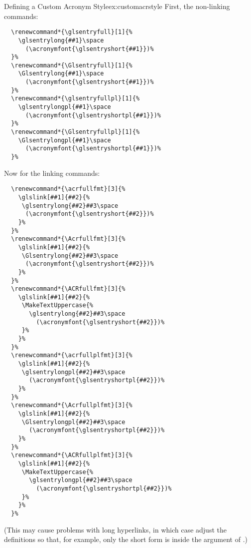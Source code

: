 \documentclass[report,inlinetitle]{nlctdoc}
\begin{document}
\begin{example}{Defining a Custom Acronym Style}{ex:customacrstyle}
First, the non-linking commands: 
\begin{verbatim}
  \renewcommand*{\glsentryfull}[1]{%
    \glsentrylong{##1}\space
      (\acronymfont{\glsentryshort{##1}})%
  }%
  \renewcommand*{\Glsentryfull}[1]{%
    \Glsentrylong{##1}\space
      (\acronymfont{\glsentryshort{##1}})%
  }%
  \renewcommand*{\glsentryfullpl}[1]{%
    \glsentrylongpl{##1}\space
      (\acronymfont{\glsentryshortpl{##1}})%
  }%
  \renewcommand*{\Glsentryfullpl}[1]{%
    \Glsentrylongpl{##1}\space
      (\acronymfont{\glsentryshortpl{##1}})%
  }%
\end{verbatim}
Now for the linking commands:
\begin{verbatim}
  \renewcommand*{\acrfullfmt}[3]{%
    \glslink[##1]{##2}{%
     \glsentrylong{##2}##3\space
      (\acronymfont{\glsentryshort{##2}})%
    }%
  }%
  \renewcommand*{\Acrfullfmt}[3]{%
    \glslink[##1]{##2}{%
     \Glsentrylong{##2}##3\space
      (\acronymfont{\glsentryshort{##2}})%
    }%
  }%
  \renewcommand*{\ACRfullfmt}[3]{%
    \glslink[##1]{##2}{%
     \MakeTextUppercase{%
       \glsentrylong{##2}##3\space
         (\acronymfont{\glsentryshort{##2}})%
     }%
    }%
  }%
  \renewcommand*{\acrfullplfmt}[3]{%
    \glslink[##1]{##2}{%
     \glsentrylongpl{##2}##3\space
       (\acronymfont{\glsentryshortpl{##2}})%
    }%
  }%
  \renewcommand*{\Acrfullplfmt}[3]{%
    \glslink[##1]{##2}{%
     \Glsentrylongpl{##2}##3\space
       (\acronymfont{\glsentryshortpl{##2}})%
    }%
  }%
  \renewcommand*{\ACRfullplfmt}[3]{%
    \glslink[##1]{##2}{%
     \MakeTextUppercase{%
       \glsentrylongpl{##2}##3\space
         (\acronymfont{\glsentryshortpl{##2}})%
     }%
    }%
  }%
\end{verbatim}
(This may cause problems with long hyperlinks, in which case adjust
the definitions so that, for example, only the short form is inside
the argument of .)


\end{example}
\end{document}
